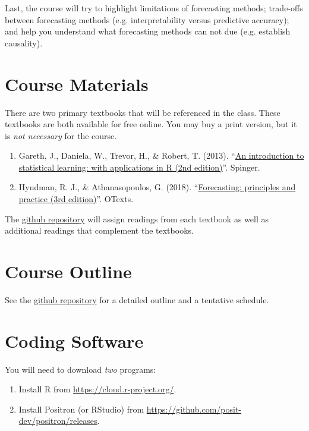 \documentclass[12pt]{article}
\begin{document}
Last, the course will try to highlight limitations of forecasting methods; trade-offs between forecasting methods (e.g. interpretability versus predictive accuracy); and help you understand what forecasting methods can not due (e.g. establish causality). 


\newpage
\section*{Course Materials}

There are two primary textbooks that will be referenced in the class. These textbooks are both available for free online. You may buy a print version, but it is \emph{not necessary} for the course. 

\begin{enumerate}
  \item Gareth, J., Daniela, W., Trevor, H., \& Robert, T. (2013). ``\href{https://www.statlearning.com}{An introduction to statistical learning: with applications in R (2nd edition)}''. Spinger.
  \item Hyndman, R. J., \& Athanasopoulos, G. (2018). ``\href{https://otexts.com/fpp3/}{Forecasting: principles and practice (3rd edition)}''. OTexts.
\end{enumerate}

The \href{https://github.com/kylebutts/UARK_5753}{github repository} will assign readings from each textbook as well as additional readings that complement the textbooks.


\section*{Course Outline}

See the \href{https://github.com/kylebutts/UARK_5753}{github repository} for a detailed outline and a tentative schedule.


\section*{Coding Software}

You will need to download \emph{two} programs:
\begin{enumerate}
  \item Install R from \url{https://cloud.r-project.org/}.
  \item Install Positron (or RStudio) from \url{https://github.com/posit-dev/positron/releases}. 
\end{enumerate}
\end{document}
